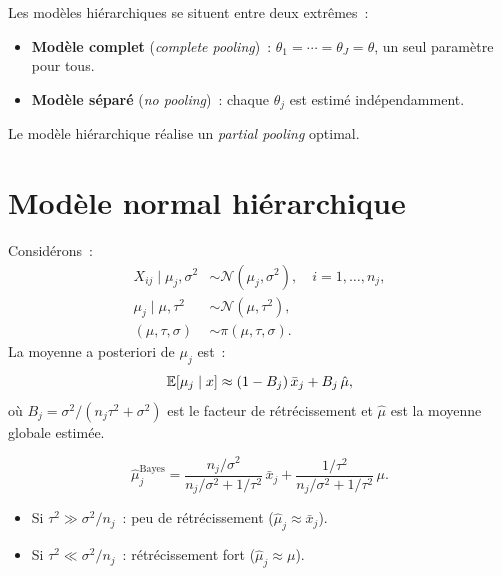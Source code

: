\begin{remarque}
Les mod\`eles hi\'erarchiques se situent entre deux extr\^emes~:
\begin{itemize}
  \item \textbf{Mod\`ele complet} (\textit{complete pooling})~:
        $\theta_1 = \cdots = \theta_J = \theta$, un seul param\`etre
        pour tous.
  \item \textbf{Mod\`ele s\'epar\'e} (\textit{no pooling})~:
        chaque $\theta_j$ est estim\'e ind\'ependamment.
\end{itemize}
Le mod\`ele hi\'erarchique r\'ealise un \textit{partial pooling} optimal.
\end{remarque}

\section{Mod\`ele normal hi\'erarchique}

\begin{theoreme}
\label{thm:hierarch_normal}
Consid\'erons~:
\begin{align*}
  X_{ij} \mid \mu_j, \sigma^2 &\sim \mathcal{N}(\mu_j, \sigma^2),
  \quad i = 1, \ldots, n_j, \\
  \mu_j \mid \mu, \tau^2 &\sim \mathcal{N}(\mu, \tau^2), \\
  (\mu, \tau, \sigma) &\sim \pi(\mu, \tau, \sigma).
\end{align*}
La moyenne a posteriori de $\mu_j$ est~:
\[
  \mathbb{E}[\mu_j \mid x] \approx (1 - B_j)\,\bar{x}_j + B_j\,\hat{\mu},
\]
o\`u $B_j = \sigma^2/(n_j\tau^2 + \sigma^2)$ est le facteur de
r\'etr\'ecissement et $\hat{\mu}$ est la moyenne globale estim\'ee.
\end{theoreme}

\begin{formules}[title=\textbf{R\'etr\'ecissement hi\'erarchique}]
\[
  \hat{\mu}_j^{\text{Bayes}} = \frac{n_j/\sigma^2}{n_j/\sigma^2 + 1/\tau^2}\,\bar{x}_j
  + \frac{1/\tau^2}{n_j/\sigma^2 + 1/\tau^2}\,\mu.
\]
\begin{itemize}
  \item Si $\tau^2 \gg \sigma^2/n_j$~: peu de r\'etr\'ecissement
        ($\hat{\mu}_j \approx \bar{x}_j$).
  \item Si $\tau^2 \ll \sigma^2/n_j$~: r\'etr\'ecissement fort
        ($\hat{\mu}_j \approx \mu$).
\end{itemize}
\end{formules}

